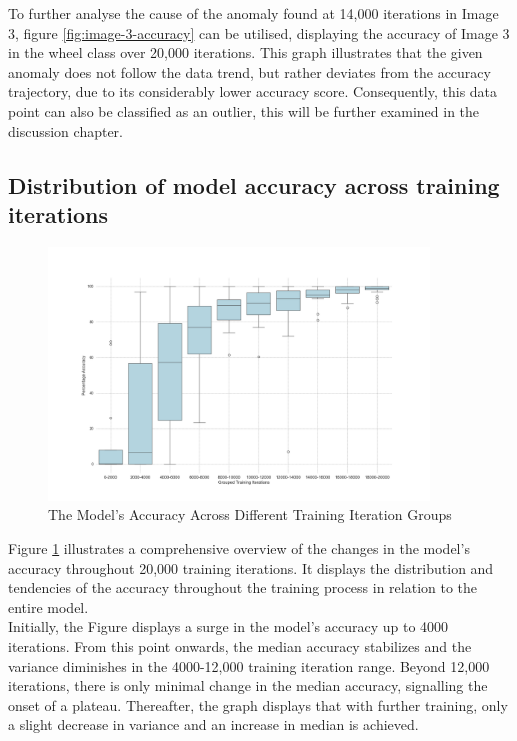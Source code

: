 To further analyse the cause of the anomaly found at 14,000 iterations in Image 3, figure \ref{fig:image-3-accuracy} can be utilised, displaying the accuracy of Image 3 in the wheel class over 20,000 iterations. This graph illustrates that the given anomaly does not follow the data trend, but rather deviates from the accuracy trajectory, due to its considerably lower accuracy score. Consequently, this data point can also be classified as an outlier, this will be further examined in the discussion chapter. \\


\subsection{Distribution of model accuracy across training iterations}

\begin{figure}[h]
   \centering
   \includegraphics[width=0.9\textwidth]{../Data/box_plot_iteration_vs_accuracy.png}
   \caption{The Model's Accuracy Across Different Training Iteration Groups}
   \label{fig:Box-plot}
\end{figure}


Figure \ref{fig:Box-plot} illustrates a comprehensive overview of the changes in the model's accuracy throughout 20,000 training iterations. It displays the distribution and tendencies of the accuracy throughout the training process in relation to the entire model.\\

Initially, the Figure displays a surge in the model's accuracy up to 4000 iterations. From this point onwards, the median accuracy stabilizes and the variance diminishes in the 4000-12,000 training iteration range. Beyond 12,000 iterations, there is only minimal change in the median accuracy, signalling the onset of a plateau. Thereafter, the graph displays that with further training, only a slight decrease in variance and an increase in median is achieved. \\

